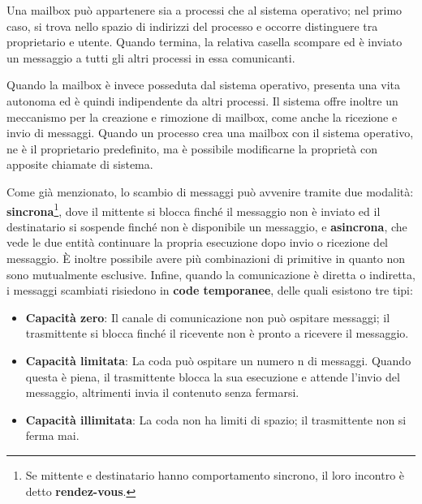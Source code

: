 \noindent Una mailbox può appartenere sia a processi che al sistema operativo; nel primo caso, si trova nello spazio di indirizzi del processo e occorre distinguere tra proprietario e utente. Quando termina, la relativa casella scompare ed è inviato un messaggio a tutti gli altri processi in essa comunicanti.\par
Quando la mailbox è invece posseduta dal sistema operativo, presenta una vita autonoma ed è quindi indipendente da altri processi. Il sistema offre inoltre un meccanismo per la creazione e rimozione di mailbox, come anche la ricezione e invio di messaggi. Quando un processo crea una mailbox con il sistema operativo, ne è il proprietario predefinito, ma è possibile modificarne la proprietà con apposite chiamate di sistema.\par
Come già menzionato, lo scambio di messaggi può avvenire tramite due modalità: \textbf{sincrona}\footnote{Se mittente e destinatario hanno comportamento sincrono, il loro incontro è detto \textbf{rendez-vous}.}, dove il mittente si blocca finché il messaggio non è inviato ed il destinatario si sospende finché non è disponibile un messaggio, e \textbf{asincrona}, che vede le due entità continuare la propria esecuzione dopo invio o ricezione del messaggio. È inoltre possibile avere più combinazioni di primitive in quanto non sono mutualmente esclusive. Infine, quando la comunicazione è diretta o indiretta, i messaggi scambiati risiedono in \textbf{code temporanee}, delle quali esistono tre tipi: \begin{itemize}
	\item \textbf{Capacità zero}: Il canale di comunicazione non può ospitare messaggi; il trasmittente si blocca finché il ricevente non è pronto a ricevere il messaggio.
	\item \textbf{Capacità limitata}: La coda può ospitare un numero n di messaggi. Quando questa è piena, il trasmittente blocca la sua esecuzione e attende l'invio del messaggio, altrimenti invia il contenuto senza fermarsi.
	\item \textbf{Capacità illimitata}: La coda non ha limiti di spazio; il trasmittente non si ferma mai.
\end{itemize}